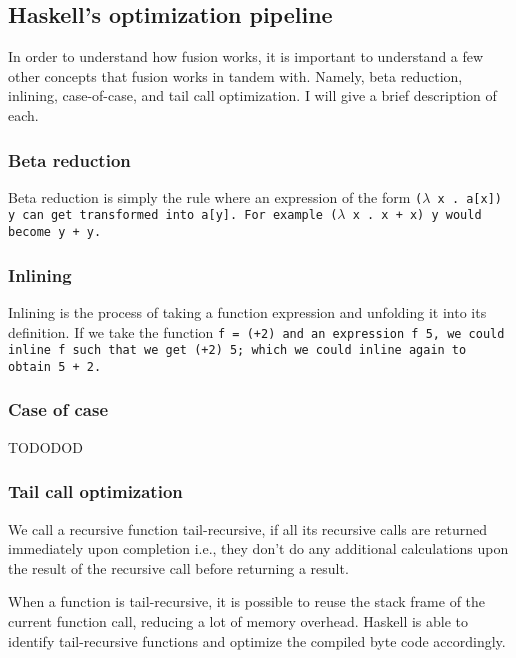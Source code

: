 \subsection{Haskell's optimization pipeline}
In order to understand how fusion works, it is important to understand a few other concepts that fusion works in tandem with.
Namely, beta reduction, inlining, case-of-case, and tail call optimization.
I will give a brief description of each.

\subsubsection{Beta reduction}
Beta reduction is simply the rule where an expression of the form \tt{($\lambda$ x . a[x]) y} can get transformed into \tt{a[y]}.
For example \tt{($\lambda$ x . x + x) y} would become \tt{y + y}.
\subsubsection{Inlining}
Inlining is the process of taking a function expression and unfolding it into its definition.
If we take the function \tt{f = (+2)} and an expression \tt{f 5}, we could inline \tt{f} such that we get \tt{(+2) 5}; which we could inline again to obtain \tt{5 + 2}.
\subsubsection{Case of case}
TODODOD
\subsubsection{Tail call optimization}
We call a recursive function tail-recursive, if all its recursive calls are returned immediately upon completion i.e., they don't do any additional calculations upon the result of the recursive call before returning a result.

When a function is tail-recursive, it is possible to reuse the stack frame of the current function call, reducing a lot of memory overhead.
Haskell is able to identify tail-recursive functions and optimize the compiled byte code accordingly.
